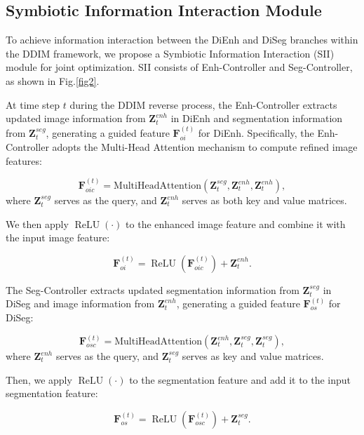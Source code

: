 \documentclass{article}
\begin{document}
\subsection{Symbiotic Information Interaction Module}


To achieve information interaction between the DiEnh and DiSeg branches within the DDIM framework, we propose a Symbiotic Information Interaction (SII) module for joint optimization. SII consists of Enh-Controller and Seg-Controller, as shown in Fig.\ref{fig2}.

At time step $t$ during the DDIM reverse process, the Enh-Controller extracts updated image information from $\mathbf{Z}_t^{enh}$ in DiEnh and segmentation information from $\mathbf{Z}_t^{seg}$, generating a guided feature $\mathbf{F}_{oi}^{(t)}$ for DiEnh. Specifically, the Enh-Controller adopts the Multi-Head Attention mechanism to compute refined image features:

\begin{equation}
\mathbf{F}_{oic}^{(t)} = \text{MultiHeadAttention}\left(\mathbf{Z}_t^{seg}, \mathbf{Z}_t^{enh}, \mathbf{Z}_t^{enh}\right),
\end{equation}
where $\mathbf{Z}_t^{seg}$ serves as the query, and $\mathbf{Z}_t^{enh}$ serves as both key and value matrices.

We then apply $\operatorname{ReLU}(\cdot)$ to the enhanced image feature and combine it with the input image feature:

\begin{equation}
\mathbf{F}_{oi}^{(t)} = \operatorname{ReLU}\left(\mathbf{F}_{oic}^{(t)}\right) + \mathbf{Z}_t^{enh}.
\end{equation}

The Seg-Controller extracts updated segmentation information from $\mathbf{Z}_t^{seg}$ in DiSeg and image information from $\mathbf{Z}_t^{enh}$, generating a guided feature $\mathbf{F}_{os}^{(t)}$ for DiSeg:

\begin{equation}
\mathbf{F}_{osc}^{(t)} = \text{MultiHeadAttention}\left(\mathbf{Z}_t^{enh}, \mathbf{Z}_t^{seg}, \mathbf{Z}_t^{seg}\right),
\end{equation}
where $\mathbf{Z}_t^{enh}$ serves as the query, and $\mathbf{Z}_t^{seg}$ serves as key and value matrices.

Then, we apply $\operatorname{ReLU}(\cdot)$ to the segmentation feature and add it to the input segmentation feature:

\begin{equation}
\mathbf{F}_{os}^{(t)} = \operatorname{ReLU}\left(\mathbf{F}_{osc}^{(t)}\right) + \mathbf{Z}_t^{seg}.
\end{equation}
\end{document}
